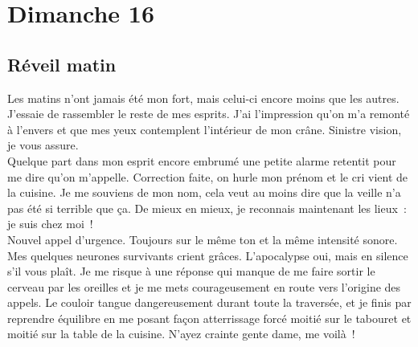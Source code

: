 ﻿\section*{Dimanche 16}
\subsection*{Réveil matin}
Les matins n’ont jamais été mon fort, mais celui-ci encore moins que les autres. J’essaie de rassembler le reste de mes esprits. J’ai l’impression qu’on m’a remonté à l’envers et que mes yeux contemplent l’intérieur de mon crâne. Sinistre vision, je vous assure. \\
Quelque part dans mon esprit encore embrumé une petite alarme retentit pour me dire qu’on m’appelle. Correction faite, on hurle mon prénom et le cri vient de la cuisine. Je me souviens de mon nom, cela veut au moins dire que la veille n’a pas été si terrible que ça. De mieux en mieux, je reconnais maintenant les lieux : je suis chez moi ! \\

Nouvel appel d’urgence. Toujours sur le même ton et la même intensité sonore. Mes quelques neurones survivants crient grâces. L’apocalypse oui, mais en silence s’il vous plaît. Je me risque à une réponse qui manque de me faire sortir le cerveau par les oreilles et je me mets courageusement en route vers l’origine des appels. Le couloir tangue dangereusement durant toute la traversée, et je finis par reprendre équilibre en me posant façon atterrissage forcé moitié sur le tabouret et moitié sur la table de la cuisine. N’ayez crainte gente dame, me voilà !\\

